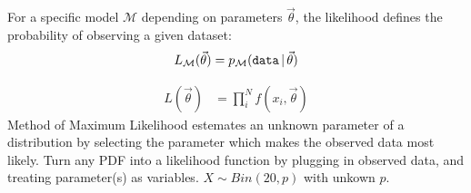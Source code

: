 For a specific model \(\mathcal{M}\) depending on parameters \(\vec{\theta}\), the likelihood defines the probability of observing a given dataset: 
\begin{align*}
	L_{\mathcal{M}}(\vec{\theta})=p_\mathcal{M}({\tt data}\,|\,\vec{\theta})
\end{align*}

\begin{align*}
	L(\vec{\theta})&=\prod_{i}^{N} f(x_i,\vec{\theta})
\end{align*}
Method of Maximum Likelihood estemates an unknown parameter of a distribution by selecting the parameter which makes the observed data most likely. 
Turn any PDF into a likelihood function by plugging in observed data, and treating parameter(s) as variables. 
\(X\sim Bin(20,p)\) with unkown \(p\).